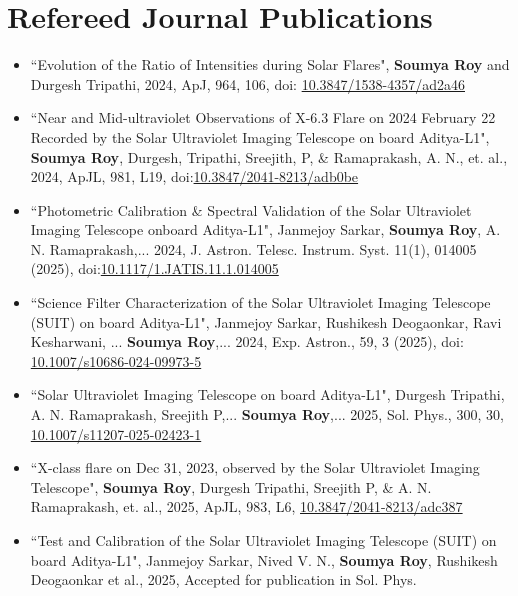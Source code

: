 \section*{Refereed Journal Publications}

\begin{itemize}
    \item ``Evolution of the Ratio of  Intensities during Solar Flares", {\bf Soumya Roy} and Durgesh Tripathi, 2024, ApJ, 964, 106, doi: \href{https://iopscience.iop.org/article/10.3847/1538-4357/ad2a46}{10.3847/1538-4357/ad2a46}\footnotemark[1]
    \item ``Near and Mid-ultraviolet Observations of X-6.3 Flare on 2024 February 22 Recorded by the Solar Ultraviolet Imaging Telescope on board Aditya-L1", {\bf Soumya Roy}, Durgesh, Tripathi, Sreejith, P, \& Ramaprakash, A. N., et. al., 2024, ApJL, 981, L19, doi:\href{https://iopscience.iop.org/article/10.3847/2041-8213/adb0be}{10.3847/2041-8213/adb0be}\footnotemark[1]
    \item ``Photometric Calibration \& Spectral Validation of the Solar Ultraviolet Imaging Telescope onboard Aditya-L1", Janmejoy Sarkar, {\bf Soumya Roy}, A. N. Ramaprakash,... 2024, J. Astron. Telesc. Instrum. Syst. 11(1), 014005 (2025), doi:\href{https://www.spiedigitallibrary.org/journals/Journal-of-Astronomical-Telescopes-Instruments-and-Systems/volume-11/issue-1/014005/Photometric-calibration-and-spectral-validation-of-the-Solar-Ultraviolet-Imaging/10.1117/1.JATIS.11.1.014005.short}{10.1117/1.JATIS.11.1.014005}\footnotemark[1]
    \item ``Science Filter Characterization of the Solar Ultraviolet Imaging Telescope (SUIT) on board Aditya-L1", Janmejoy Sarkar, Rushikesh Deogaonkar, Ravi Kesharwani, ... {\bf Soumya Roy},... 2024, Exp. Astron., 59, 3 (2025), doi: \href{https://doi.org/10.1007/s10686-024-09973-5}{10.1007/s10686-024-09973-5}
    \item ``Solar Ultraviolet Imaging Telescope on board Aditya-L1", Durgesh Tripathi, A. N. Ramaprakash, Sreejith P,... {\bf Soumya Roy},... 2025, Sol. Phys., 300, 30, \href{10.1007/s11207-025-02423-1}{10.1007/s11207-025-02423-1}\footnotemark[1]
    \item ``X-class flare on Dec 31, 2023, observed by the Solar Ultraviolet Imaging Telescope", {\bf Soumya Roy}, Durgesh Tripathi, Sreejith P, \& A. N. Ramaprakash, et. al., 2025, ApJL, 983, L6, \href{https://doi.org/10.3847/2041-8213/adc387}{10.3847/2041-8213/adc387}
    \item ``Test and Calibration of the Solar Ultraviolet
Imaging Telescope (SUIT) on board Aditya-L1", Janmejoy Sarkar, Nived V. N., {\bf Soumya Roy}, Rushikesh Deogaonkar et al., 2025, Accepted for publication in Sol. Phys.

\end{itemize}

